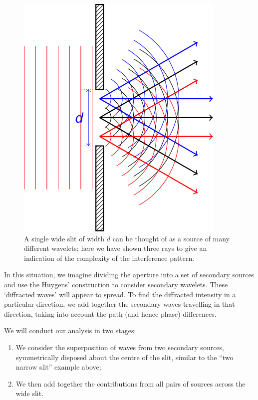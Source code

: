 \documentclass[
]{book}
\providecommand{\tightlist}{%
  \setlength{\itemsep}{0pt}\setlength{\parskip}{0pt}}
\begin{document}
\begin{figure}

{\centering \includegraphics[width=0.7\linewidth]{visualisations/LaTeX/ch13-singlewideslit1} 

}

\caption{A single wide slit of width $d$ can be thought of as a source of many different wavelets; here we have shown three rays to give an indication of the complexity of the interference pattern.}\label{fig:ch13-singlewideslit1}
\end{figure}

In this situation, we imagine dividing the aperture into a set of secondary sources and use the Huygens' construction to consider secondary wavelets. These `diffracted waves' will appear to spread. To find the diffracted intensity in a particular direction, we add together the secondary waves travelling in that direction, taking into account the path (and hence phase) differences.

We will conduct our analysis in two stages:

\begin{enumerate}
\def\labelenumi{\arabic{enumi}.}
\tightlist
\item
  We consider the superposition of waves from two secondary sources, symmetrically disposed about the centre of the slit, similar to the ``two narrow slit'' example above;
\item
  We then add together the contributions from all pairs of sources across the wide slit.
\end{enumerate}
\end{document}
